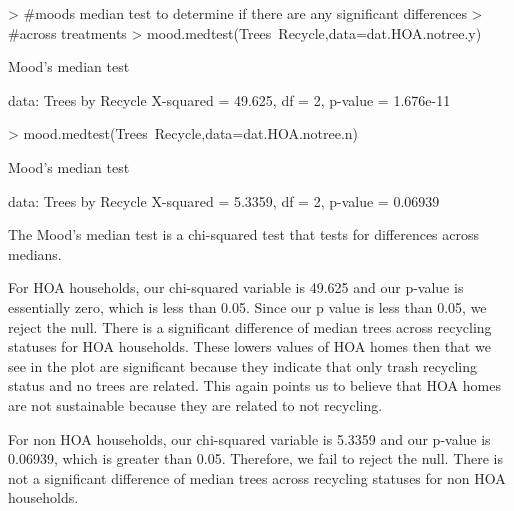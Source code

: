 \documentclass{article}
\begin{document}
\begin{Schunk}
\begin{Sinput}
> #moods median test to determine if there are any significant differences
> #across treatments
> mood.medtest(Trees~Recycle,data=dat.HOA.notree.y)
\end{Sinput}
\begin{Soutput}
	Mood's median test

data:  Trees by Recycle
X-squared = 49.625, df = 2, p-value = 1.676e-11
\end{Soutput}
\begin{Sinput}
> mood.medtest(Trees~Recycle,data=dat.HOA.notree.n)
\end{Sinput}
\begin{Soutput}
	Mood's median test

data:  Trees by Recycle
X-squared = 5.3359, df = 2, p-value = 0.06939
\end{Soutput}
\end{Schunk}

The Mood's median test is a chi-squared test that tests for differences across medians. 

For HOA households, our chi-squared variable is 49.625 and our p-value is essentially zero, which is less than 0.05. Since our p value is less than 0.05, we reject the null. There is a significant difference of median trees across recycling statuses for HOA households. These lowers values of HOA homes then that we see in the plot are significant because they indicate that only trash recycling status and no trees are related. This again points us to believe that HOA homes are not sustainable because they are related to not recycling. 

For non HOA households, our chi-squared variable is 5.3359 and our p-value is 0.06939, which is greater than 0.05. Therefore, we fail to reject the null. There is not a significant difference of median trees across recycling statuses for non HOA households. 
\end{document}
